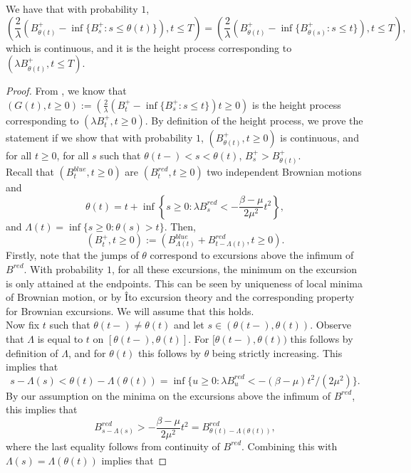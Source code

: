 \begin{lemma}\label{lemma.heightprocesstimechange}
We have that with probability $1$, $$\left(\frac{2}{\lambda} \left(B^+_{\theta (t)}-\inf\{B^+_{s}:s\leq \theta(t)\}\right), t\leq T \right)=\left(\frac{2}{\lambda} \left(B^+_{\theta (t)}-\inf\{B^+_{\theta(s)}:s\leq t\}\right), t\leq T \right),$$ which is continuous, and it is the height process corresponding to $\left(\lambda B^+_{\theta (t)},t\leq T\right)$. 
\end{lemma}
\begin{proof}
From \cite{Legall2005}, we know that $(G(t),t\geq 0):=\left(\frac{2}{\lambda} \left(B^+_{t}-\inf\{B^+_{s}:s\leq t\}\right)  t\geq 0 \right)$ is the height process corresponding to $\left(\lambda B^+_{t},t\geq 0\right)$. By definition of the height process, we prove the statement if we show that with probability $1$, $(B^+_{\theta(t)},t\geq 0)$ is continuous, and for all $t\geq 0$, for all $s$ such that $\theta(t-)<s<\theta(t)$, $ B^+_s > B^+_{\theta(t)}$. \\
Recall that $(B^{blue}_t, t \geq 0)$ are $(B^{red}_t, t\geq 0)$ two independent Brownian motions and  $$\theta(t)=t+\inf\left\{s\geq 0 : \lambda B^{red}_s< -\frac{\beta - \mu}{2\mu^2} t^2\right\},$$ and $\Lambda(t)=\inf\{s\geq 0:\theta(s)> t\}$. Then, \begin{equation*}\left(B^+_t,t \geq 0\right):=\left( B^{blue}_{\Lambda(t)}+ B^{red}_{t-\Lambda(t)}, t\geq 0\right).\end{equation*}
Firstly, note that the jumps of $\theta$ correspond to excursions above the infimum of $B^{red}$.  With probability $1$, for all these excursions, the minimum on the excursion is only attained at the endpoints. This can be seen by uniqueness of local minima of Brownian motion, or by \^Ito excursion theory and the corresponding property for Brownian excursions. We will assume that this holds.\\
Now fix $t$ such that $\theta(t-)\neq \theta(t)$ and let $s\in (\theta(t-),\theta(t))$. Observe that $\Lambda$ is equal to $t$ on $[\theta(t-),\theta(t)]$. For $[\theta(t-),\theta(t))$ this follows by definition of $\Lambda$, and for $\theta(t)$ this follows by $\theta$ being strictly increasing. This implies that $$s-\Lambda(s)<\theta(t)-\Lambda(\theta(t))=\inf\{ u\geq 0: \lambda B_u^{red}<-(\beta-\mu)t^2/(2\mu^2)\}.$$ By our assumption on the minima on the excursions above the infimum of $B^{red}$, this implies that $$B^{red}_{s-\Lambda(s)}>-\frac{\beta - \mu}{2\mu^2} t^2=B^{red}_{\theta(t)-\Lambda(\theta(t))},$$
where the last equality follows from continuity of $B^{red}$. Combining this with $\Lambda(s)=\Lambda(\theta(t))$ implies that

\end{proof}
